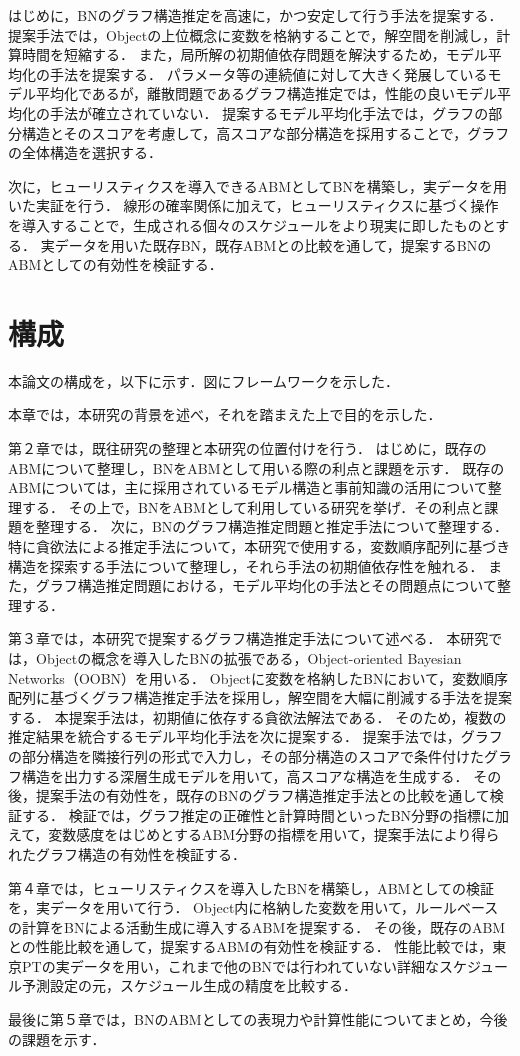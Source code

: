 はじめに，BNのグラフ構造推定を高速に，かつ安定して行う手法を提案する．
提案手法では，Objectの上位概念に変数を格納することで，解空間を削減し，計算時間を短縮する．
また，局所解の初期値依存問題を解決するため，モデル平均化の手法を提案する．
パラメータ等の連続値に対して大きく発展しているモデル平均化であるが\cite{Xiang1997}，離散問題であるグラフ構造推定では，性能の良いモデル平均化の手法が確立されていない\cite{Xiang1997}．
提案するモデル平均化手法では，グラフの部分構造とそのスコアを考慮して，高スコアな部分構造を採用することで，グラフの全体構造を選択する．

次に，ヒューリスティクスを導入できるABMとしてBNを構築し，実データを用いた実証を行う．
線形の確率関係に加えて，ヒューリスティクスに基づく操作を導入することで，生成される個々のスケジュールをより現実に即したものとする．
実データを用いた既存BN，既存ABMとの比較を通して，提案するBNのABMとしての有効性を検証する．

\section{構成}\label{1.3}
本論文の構成を，以下に示す．図にフレームワークを示した．

本章では，本研究の背景を述べ，それを踏まえた上で目的を示した．

第２章では，既往研究の整理と本研究の位置付けを行う．
はじめに，既存のABMについて整理し，BNをABMとして用いる際の利点と課題を示す．
既存のABMについては，主に採用されているモデル構造と事前知識の活用について整理する．
その上で，BNをABMとして利用している研究を挙げ．その利点と課題を整理する．
次に，BNのグラフ構造推定問題と推定手法について整理する．
特に貪欲法による推定手法について，本研究で使用する，変数順序配列に基づき構造を探索する手法について整理し，それら手法の初期値依存性を触れる．
また，グラフ構造推定問題における，モデル平均化の手法とその問題点について整理する．

第３章では，本研究で提案するグラフ構造推定手法について述べる．
本研究では，Objectの概念を導入したBNの拡張である，Object-oriented Bayesian Networks（OOBN）\cite{Xiang1997}を用いる．
Objectに変数を格納したBNにおいて，変数順序配列に基づくグラフ構造推定手法\cite{Xiang1997}を採用し，解空間を大幅に削減する手法を提案する．
本提案手法は，初期値に依存する貪欲法解法である．
そのため，複数の推定結果を統合するモデル平均化手法を次に提案する．
提案手法では，グラフの部分構造を隣接行列の形式で入力し，その部分構造のスコアで条件付けたグラフ構造を出力する深層生成モデル\cite{Xiang1997}を用いて，高スコアな構造を生成する．
その後，提案手法の有効性を，既存のBNのグラフ構造推定手法との比較を通して検証する．
検証では，グラフ推定の正確性と計算時間といったBN分野の指標に加えて，変数感度をはじめとするABM分野の指標を用いて，提案手法により得られたグラフ構造の有効性を検証する．

第４章では，ヒューリスティクスを導入したBNを構築し，ABMとしての検証を，実データを用いて行う．
Object内に格納した変数を用いて，ルールベースの計算をBNによる活動生成に導入するABMを提案する．
その後，既存のABMとの性能比較を通して，提案するABMの有効性を検証する．
性能比較では，東京PTの実データを用い，これまで他のBNでは行われていない詳細なスケジュール予測設定の元，スケジュール生成の精度を比較する．

最後に第５章では，BNのABMとしての表現力や計算性能についてまとめ，今後の課題を示す．